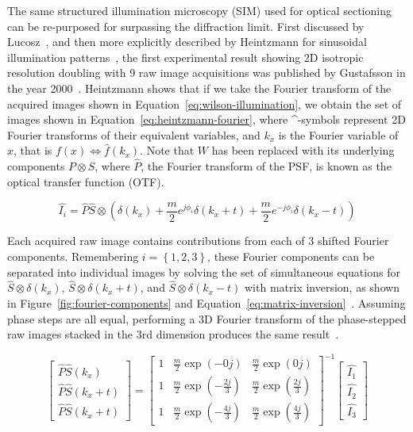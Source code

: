 The same structured illumination microscopy (SIM) used for optical sectioning can be re-purposed for surpassing the diffraction limit. 
First discussed by Lucosz~\cite{lukosz1966optical}, and then more explicitly described by Heintzmann for sinusoidal illumination patterns~\cite{heintzmann1999laterally}, the first experimental result showing 2D isotropic resolution doubling with 9 raw image acquisitions was published by Gustafsson in the year \num{2000}~\cite{gustafsson2000surpassing}. 
Heintzmann shows that if we take the Fourier transform of the acquired images shown in Equation~\ref{eq:wilson-illumination}, we obtain the set of images shown in Equation~\ref{eq:heintzmann-fourier}, where \^{}-symbols represent 2D Fourier transforms of their equivalent variables, and $k_x$ is the Fourier variable of $x$, that is $f(x) \Leftrightarrow \hat{f}(k_x)$. 
Note that $W$ has been replaced with its underlying components $P\otimes S$, where $\hat{P}$, the Fourier transform of the PSF, is known as the optical transfer function (OTF). 

\begin{equation} \label{eq:heintzmann-fourier}
\hat{I_i} = \hat{P} \hat{S} \otimes \left( \delta \left( k_x \right) + \frac{m}{2} e^{j\phi_i} \delta \left( k_x + t \right) + \frac{m}{2} e^{-j\phi_i} \delta \left( k_x - t \right) \right) 
\end{equation}

Each acquired raw image contains contributions from each of 3 shifted Fourier components. 
Remembering $i=\left\lbrace1,2,3\right\rbrace$, these Fourier components can be separated into individual images by solving the set of simultaneous equations for $\hat{S}\otimes\delta \left( k_x \right)$, $\hat{S}\otimes\delta \left( k_x + t \right)$, and $\hat{S}\otimes\delta \left( k_x - t \right)$ with matrix inversion, as shown in Figure~\ref{fig:fourier-components} and Equation~\ref{eq:matrix-inversion}~\cite{wicker2013phase}. 
Assuming phase steps are all equal, performing a 3D Fourier transform of the phase-stepped raw images stacked in the 3rd dimension produces the same result~\cite{gustafsson2005nonlinear}. 

\begin{equation} \label{eq:matrix-inversion}
\begin{bmatrix} \hat{P}\hat{S}\left(k_x\right) \\ \hat{P}\hat{S}\left(k_x+t\right) \\ \hat{P}\hat{S}\left(k_x+t\right) \end{bmatrix} = 
\begin{bmatrix}
1 & \frac{m}{2}\exp\left(-0j\right) & \frac{m}{2}\exp\left(0j\right) \\ 
1 & \frac{m}{2}\exp\left(-\frac{2j}{3}\right) & \frac{m}{2}\exp\left(\frac{2j}{3}\right) \\ 
1 & \frac{m}{2}\exp\left(-\frac{4j}{3}\right) & \frac{m}{2}\exp\left(\frac{4j}{3}\right)
\end{bmatrix}^{-1}
\begin{bmatrix} \hat{I_1} \\ \hat{I_2} \\ \hat{I_3} \end{bmatrix}
\end{equation}

